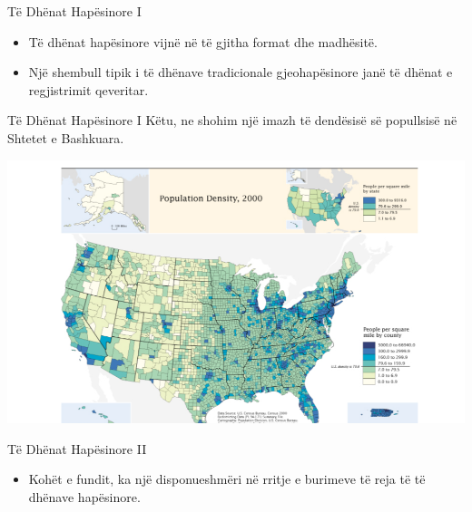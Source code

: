 \documentclass[
  ignorenonframetext,
]{beamer}
\providecommand{\tightlist}{%
  \setlength{\itemsep}{0pt}\setlength{\parskip}{0pt}}
\begin{document}
\begin{frame}{Të Dhënat Hapësinore I}
\protect\hypertarget{tuxeb-dhuxebnat-hapuxebsinore-i}{}
\begin{itemize}
\item
  Të dhënat hapësinore vijnë në të gjitha format dhe madhësitë.
\item
  Një shembull tipik i të dhënave tradicionale gjeohapësinore janë të
  dhënat e regjistrimit qeveritar.
\end{itemize}
\end{frame}

\begin{frame}{Të Dhënat Hapësinore I}
\protect\hypertarget{tuxeb-dhuxebnat-hapuxebsinore-i-1}{}
Këtu, ne shohim një imazh të dendësisë së popullsisë në Shtetet e
Bashkuara.

\includegraphics{./Figs/census1.png}
\end{frame}

\begin{frame}{Të Dhënat Hapësinore II}
\protect\hypertarget{tuxeb-dhuxebnat-hapuxebsinore-ii}{}
\begin{itemize}
\tightlist
\item
  Kohët e fundit, ka një disponueshmëri në rritje e burimeve të reja të
  të dhënave hapësinore.
\end{itemize}
\end{frame}
\end{document}
